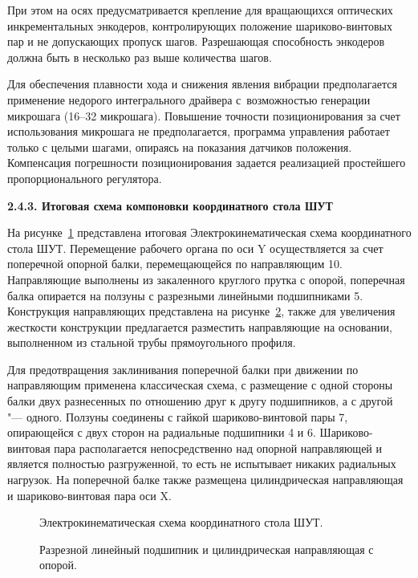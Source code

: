 При этом на осях предусматривается крепление для вращающихся оптических инкрементальных энкодеров, контролирующих положение шариково-винтовых пар и не допускающих пропуск шагов. Разрешающая способность энкодеров должна быть в несколько раз выше количества шагов.

Для обеспечения плавности хода и снижения явления вибрации предполагается применение недорого интегрального драйвера с~возможностью генерации микрошага (16--32 микрошага). Повышение точности позиционирования за счет использования микрошага не предполагается, программа управления работает только с целыми шагами, опираясь на показания датчиков положения. Компенсация погрешности позиционирования задается реализацией простейшего пропорционального регулятора.

\textbf{2.4.3. Итоговая схема компоновки координатного стола ШУТ}

На рисунке~\cref{fig:scheme} представлена итоговая Электрокинематическая схема координатного стола ШУТ. Перемещение рабочего органа по оси Y осуществляется за счет поперечной опорной балки, перемещающейся по направляющим 10. Направляющие выполнены из закаленного круглого прутка с опорой, поперечная балка опирается на ползуны с разрезными линейными подшипниками 5. Конструкция направляющих представлена на рисунке~\cref{fig:bearing}, также для увеличения жесткости конструкции предлагается разместить направляющие на основании, выполненном из стальной трубы прямоугольного профиля.

Для предотвращения заклинивания поперечной балки при движении по направляющим применена классическая схема, с размещение с одной стороны балки двух разнесенных по отношению друг к другу подшипников, а с другой "--- одного. Ползуны соединены с гайкой шариково-винтовой пары 7, опирающейся с двух сторон на радиальные подшипники 4 и 6. Шариково-винтовая пара располагается непосредственно над опорной направляющей и является полностью разгруженной, то есть не испытывает никаких радиальных нагрузок. На поперечной балке также размещена цилиндрическая направляющая и шариково-винтовая пара оси X.

\begin{figure}[ht]
	\caption{Электрокинематическая схема координатного стола ШУТ.}\label{fig:scheme}
\end{figure}

\begin{figure}[ht]
	\caption{Разрезной линейный подшипник и цилиндрическая направляющая с опорой.}\label{fig:bearing}
\end{figure}

